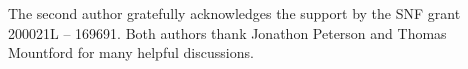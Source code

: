 \documentclass[EJP]{ejpecp} %
\begin{document}
\begin{acks}
The second author gratefully acknowledges the support by the SNF grant 200021L -- 169691. Both authors thank Jonathon Peterson and Thomas Mountford for many helpful discussions.
\end{acks}


\end{document}
